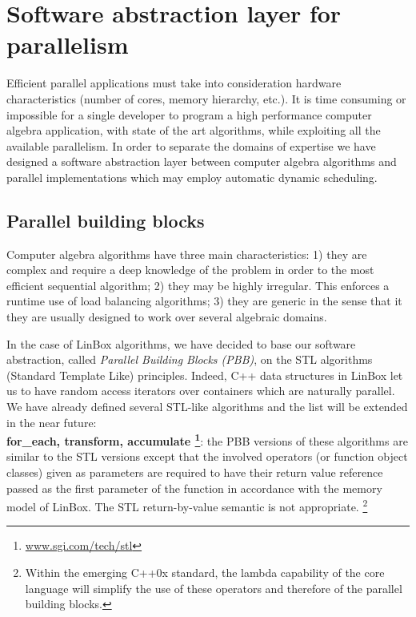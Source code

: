 \documentclass[runningheads,a4paper]{llncs}
\newcommand{\linbox}{{\sc LinBox}\xspace}
\begin{document}
%
\section{Software abstraction layer for parallelism}

Efficient parallel applications must take into consideration hardware
characteristics (number of cores, memory hierarchy, etc.). It is time
consuming or impossible for a single developer to 
program a high performance computer algebra application, with state of
the art algorithms, while exploiting all the available parallelism.  
In order to separate the domains of expertise we have designed a
software abstraction layer between computer algebra algorithms
and parallel implementations which may employ automatic dynamic scheduling.

\subsection{Parallel building blocks}\label{ssec:parallel}
Computer algebra algorithms have three main characteristics:
1) they are complex and require a deep knowledge of the problem in
  order to the most efficient sequential algorithm;
2) they may be highly irregular. This enforces a runtime use of
  load balancing algorithms;
3) they are generic in the sense that it they are usually designed
  to work over several algebraic domains.

  In the case of \linbox algorithms, we have decided to base our
  software abstraction, called {\em Parallel Building Blocks (PBB)},
  on the STL algorithms (Standard Template Like) principles.
%
  Indeed, C++ data structures in \linbox let us to have random access
  iterators over containers which are naturally parallel. 
% 
  We have already defined several STL-like algorithms and the list
  will be extended in the near future:\\
  {\bf for\_each, transform, accumulate
    \footnote{\url{www.sgi.com/tech/stl}}}: the PBB
  versions of these algorithms are similar to the STL versions 
  except that the involved operators (or function object classes) given as 
  parameters are required to have their return value reference passed as the
  first parameter of the function in accordance with the memory model 
  of \linbox. 
  The STL return-by-value semantic is not appropriate. 
  \footnote{Within the emerging C++0x standard, the lambda
    capability of the core language will simplify the use of these
    operators and therefore of the parallel building blocks.}
\end{document}
